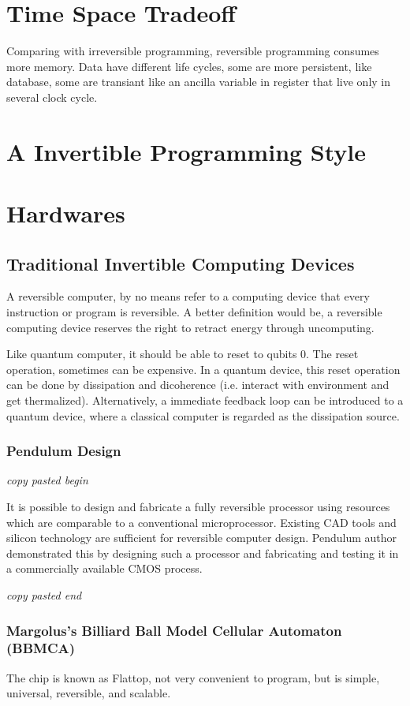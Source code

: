 \documentclass[aps,twocolumn,longbibliography,english,superscriptaddress,prr]{revtex4-1}
\newcommand{\<}{\langle}
\renewcommand{\>}{\rangle}
\begin{document}
\section{Time Space Tradeoff}
Comparing with irreversible programming, reversible programming consumes more memory.
Data have different life cycles, some are more persistent, like database, some are transiant like an ancilla variable in register that live only in several clock cycle.


\section{A Invertible Programming Style}
\section{Hardwares}
\subsection{Traditional Invertible Computing Devices}
A reversible computer, by no means refer to a computing device that every instruction or program is reversible. A better definition would be, a reversible computing device reserves the right to retract energy through uncomputing.

Like quantum computer, it should be able to reset to qubits $0$. The reset operation, sometimes can be expensive. In a quantum device, this reset operation can be done by dissipation and dicoherence (i.e. interact with environment and get thermalized). Alternatively, a immediate feedback loop can be introduced to a quantum device, where a classical computer is regarded as the dissipation source.

\subsubsection{Pendulum Design}
\textit{copy pasted begin}

It is possible to design and fabricate a fully reversible processor using resources which are comparable to a conventional microprocessor. Existing CAD tools and silicon technology are sufficient for reversible computer design.
Pendulum author demonstrated this by designing such a processor and fabricating and testing it in a commercially available CMOS process.

\textit{copy pasted end}


\subsubsection{Margolus's Billiard Ball Model Cellular Automaton (BBMCA)}
The chip is known as Flattop, not very convenient to program, but is simple, universal, reversible, and scalable.
\end{document}
